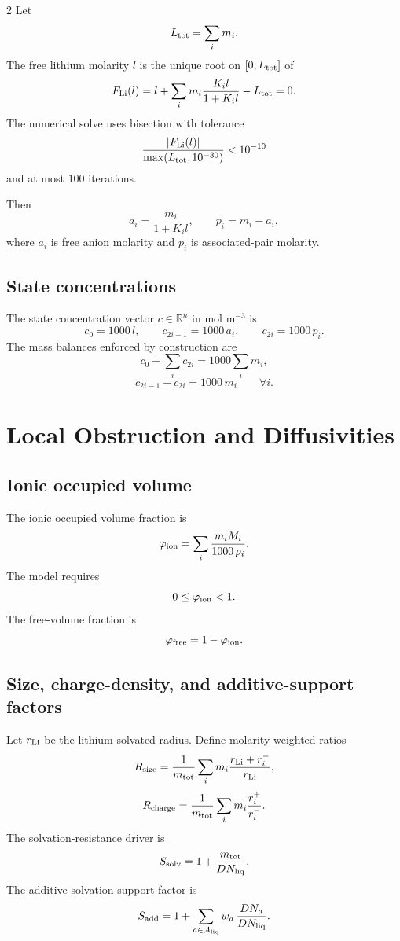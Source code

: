 \documentclass[10pt]{article}
\newcommand{\R}{\mathbb{R}}
\begin{document}
\begin{multicols}{2}
Let
\[
L_{\rm tot}=\sum_i m_i.
\]
The free lithium molarity \(l\) is the unique root on \([0,L_{\rm tot}]\) of
\[
F_{\rm Li}(l)
=
l+\sum_i m_i\frac{K_i l}{1+K_i l}-L_{\rm tot}
=0.
\]
The numerical solve uses bisection with tolerance
\[
\frac{|F_{\rm Li}(l)|}{\max(L_{\rm tot},10^{-30})}
<10^{-10}
\]
and at most \(100\) iterations.

Then
\[
a_i=\frac{m_i}{1+K_i l},
\qquad
p_i=m_i-a_i,
\]
where \(a_i\) is free anion molarity and \(p_i\) is associated-pair molarity.

\subsection{State concentrations}

The state concentration vector \(c\in\R^n\) in mol m\(^{-3}\) is
\[
c_0 = 1000\,l,
\qquad
c_{2i-1}=1000\,a_i,
\qquad
c_{2i}=1000\,p_i.
\]
The mass balances enforced by construction are
\[
c_0+\sum_i c_{2i} = 1000\sum_i m_i,
\]
\[
c_{2i-1}+c_{2i}=1000\,m_i
\qquad\forall i.
\]

\section{Local Obstruction and Diffusivities}

\subsection{Ionic occupied volume}

The ionic occupied volume fraction is
\[
\varphi_{\rm ion}
=
\sum_i \frac{m_i M_i}{1000\,\rho_i}.
\]
The model requires
\[
0\le\varphi_{\rm ion}<1.
\]
The free-volume fraction is
\[
\varphi_{\rm free}=1-\varphi_{\rm ion}.
\]

\subsection{Size, charge-density, and additive-support factors}

Let \(r_{\rm Li}\) be the lithium solvated radius. Define molarity-weighted
ratios
\[
R_{\rm size}
=
\frac{1}{m_{\rm tot}}
\sum_i m_i\frac{r_{\rm Li}+r^-_i}{r_{\rm Li}},
\]
\[
R_{\rm charge}
=
\frac{1}{m_{\rm tot}}
\sum_i m_i\frac{r^+_i}{r^-_i}.
\]
The solvation-resistance driver is
\[
S_{\rm solv}=1+\frac{m_{\rm tot}}{DN_{\rm liq}}.
\]
The additive-solvation support factor is
\[
S_{\rm add}
=
1+
\sum_{a\in\mathcal A_{\rm liq}}
w_a\,\frac{DN_a}{DN_{\rm liq}}.
\]


\end{multicols}
\end{document}
